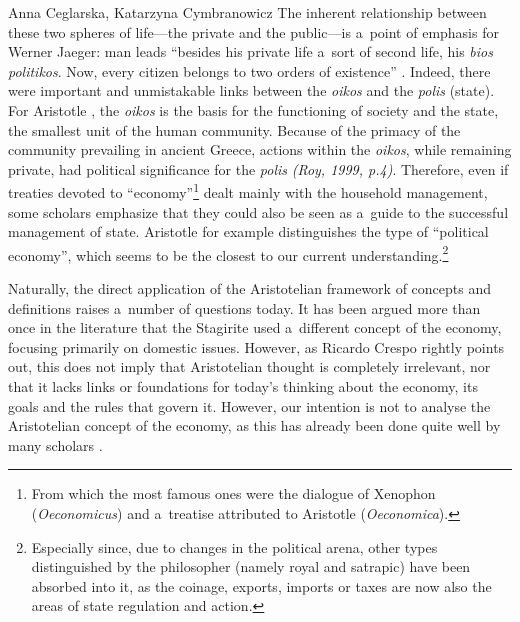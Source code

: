 \begin{artengenv2auth}{Anna Ceglarska, Katarzyna Cymbranowicz}
The inherent relationship between these two spheres of life---the private and the public---is a~point of emphasis for Werner Jaeger: man leads ``besides his private life a~sort of second life, his \textit{bios politikos}. Now, every citizen belongs to two orders of existence'' 
\parencite[][p.111]{jaeger_paideia_1946}. %
 Indeed, there were important and unmistakable links between the \textit{oikos} and the \textit{polis} (state). For Aristotle 
\parencite[][1253b.1]{rackham_nicomachean_1934}, %
 the \textit{oikos} is the basis for the functioning of society and the state, the smallest unit of the human community. Because of the primacy of the community prevailing in ancient Greece, actions within the \textit{oikos}, while remaining private, had political significance for the \textit{polis} \label{ref:RNDgDEuVBJb3a}\textit{(Roy, 1999, p.4)}. Therefore, even if treaties devoted to ``economy''\footnote{From which the most famous ones were the dialogue of Xenophon (\textit{Oeconomicus}) and a~treatise attributed to Aristotle (\textit{Oeconomica}).} dealt mainly with the household management, some scholars emphasize that they could also be seen as a~guide to the successful management of state. Aristotle 
\parencite*[][p.1345b]{aristotle_oeconomica_1920} %
 for example distinguishes the type of ``political economy'', which seems to be the closest to our current understanding.\footnote{Especially since, due to changes in the political arena, other types distinguished by the philosopher (namely royal and satrapic) have been absorbed into it, as the coinage, exports, imports or taxes are now also the areas of state regulation and action.}



Naturally, the direct application of the Aristotelian framework of concepts and definitions raises a~number of questions today. It has been argued more than once in the literature that the Stagirite used a~different concept of the economy, focusing primarily on domestic issues. However, as Ricardo Crespo 
\parencite*[][]{crespo_aristotle_2010} %
 rightly points out, this does not imply that Aristotelian thought is completely irrelevant, nor that it lacks links or foundations for today's thinking about the economy, its goals and the rules that govern it. However, our intention is not to analyse the Aristotelian concept of the economy, as this has already been done quite well by many scholars 
\parencites[e.g.,][]{crespo_ontology_2006}[][]{crespo_aristotle_2010}[][]{meikle_aristotles_1995}[][]{soudek_aristotles_1952}[][]{pack_aristotles_2008}[][]{finley_aristotle_1970}.%





\end{artengenv2auth}
